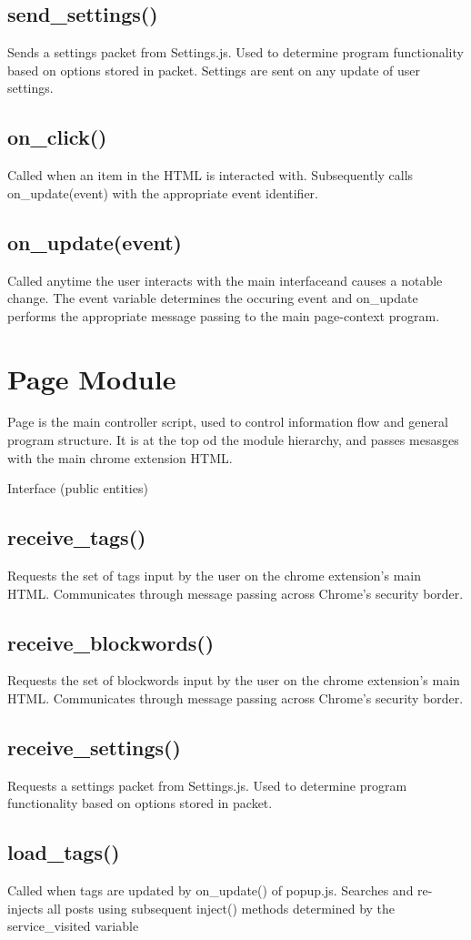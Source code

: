 \documentclass[12pt, titlepage]{article}
\begin{document}
\subsection{send\_settings()}
Sends a settings packet from Settings.js. Used to determine program functionality based on options stored in packet. Settings are sent on any update of user settings.
\subsection{on\_click()}
Called when an item in the HTML is interacted with.  Subsequently calls on\_update(event) with the appropriate event identifier.
\subsection{on\_update(event)}
Called anytime the user interacts with the main interfaceand causes a notable change. The event variable determines the occuring event and on\_update performs the appropriate message passing to the main page-context program.


\section{Page Module}
Page is the main controller script, used to control information flow and general program structure. It is at the top od the module hierarchy, and passes mesasges with the main chrome extension HTML.

Interface (public entities)
\subsection{receive\_tags()}
Requests the set of tags input by the user on the chrome extension’s main HTML. Communicates through message passing across Chrome’s security border.
\subsection{receive\_blockwords()}
Requests the set of blockwords input by the user on the chrome extension’s main HTML. Communicates through message passing across Chrome’s security border.
\subsection{receive\_settings()}
Requests a settings packet from Settings.js. Used to determine program functionality based on options stored in packet.
\subsection{load\_tags()}
Called when tags are updated by on\_update() of popup.js. Searches and re-injects all posts using subsequent inject() methods determined by the service\_visited variable
\end{document}
